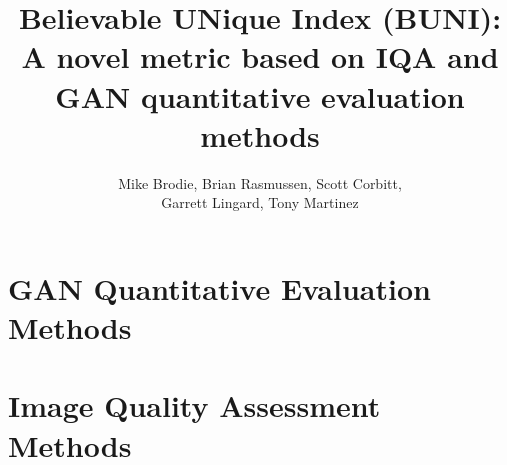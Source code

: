 \documentclass[12pt]{article}
\title{Believable UNique Index (BUNI): \\A novel metric based on IQA and GAN quantitative evaluation methods}
\date{}
\author{Mike Brodie, Brian Rasmussen, Scott Corbitt, \\ Garrett Lingard, Tony Martinez}
\begin{document}
\maketitle

\section{GAN Quantitative Evaluation Methods}


%
%
%
%

\section{Image Quality Assessment Methods}



\end{document}
